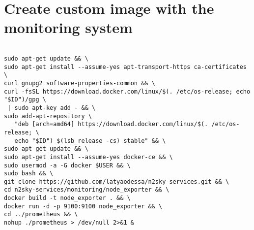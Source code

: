 \section{Create custom image with the monitoring system}\label{D}

 \begin{lstlisting}

sudo apt-get update && \
sudo apt-get install --assume-yes apt-transport-https ca-certificates \
curl gnupg2 software-properties-common && \
curl -fsSL https://download.docker.com/linux/$(. /etc/os-release; echo "$ID")/gpg \
 | sudo apt-key add - && \
sudo add-apt-repository \
   "deb [arch=amd64] https://download.docker.com/linux/$(. /etc/os-release; \
   echo "$ID") $(lsb_release -cs) stable" && \
sudo apt-get update && \
sudo apt-get install --assume-yes docker-ce && \
sudo usermod -a -G docker $USER && \
sudo bash && \
git clone https://github.com/latyaodessa/n2sky-services.git && \
cd n2sky-services/monitoring/node_exporter && \
docker build -t node_exporter . && \
docker run -d -p 9100:9100 node_exporter && \
cd ../prometheus && \
nohup ./prometheus > /dev/null 2>&1 &

\end{lstlisting}



    
